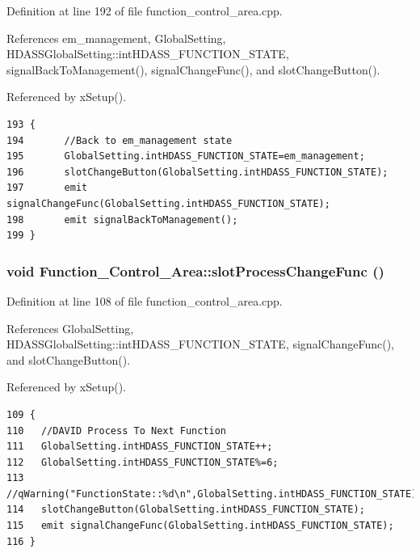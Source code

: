 Definition at line 192 of file function\_\-control\_\-area.cpp.

References em\_\-management, Global\-Setting, HDASSGlobal\-Setting::int\-HDASS\_\-FUNCTION\_\-STATE, signal\-Back\-To\-Management(), signal\-Change\-Func(), and slot\-Change\-Button().

Referenced by x\-Setup().



\footnotesize\begin{verbatim}193 {
194       //Back to em_management state
195       GlobalSetting.intHDASS_FUNCTION_STATE=em_management;
196       slotChangeButton(GlobalSetting.intHDASS_FUNCTION_STATE);
197       emit signalChangeFunc(GlobalSetting.intHDASS_FUNCTION_STATE);
198       emit signalBackToManagement();
199 }
\end{verbatim}\normalsize 
{}
\subsubsection{\setlength{\rightskip}{0pt plus 5cm}void Function\_\-Control\_\-Area::slot\-Process\-Change\-Func ()\hspace{0.3cm}{\tt  [slot]}}\label{classFunction__Control__Area_Function__Control__Areai0}




Definition at line 108 of file function\_\-control\_\-area.cpp.

References Global\-Setting, HDASSGlobal\-Setting::int\-HDASS\_\-FUNCTION\_\-STATE, signal\-Change\-Func(), and slot\-Change\-Button().

Referenced by x\-Setup().



\footnotesize\begin{verbatim}109 {
110   //DAVID Process To Next Function
111   GlobalSetting.intHDASS_FUNCTION_STATE++;
112   GlobalSetting.intHDASS_FUNCTION_STATE%=6;
113   //qWarning("FunctionState::%d\n",GlobalSetting.intHDASS_FUNCTION_STATE);
114   slotChangeButton(GlobalSetting.intHDASS_FUNCTION_STATE);
115   emit signalChangeFunc(GlobalSetting.intHDASS_FUNCTION_STATE);
116 }
\end{verbatim}\normalsize 
{}
